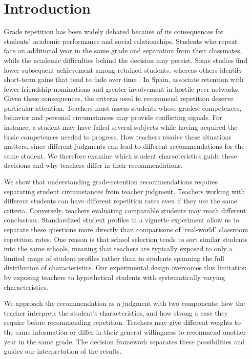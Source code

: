 \section{Introduction}
Grade repetition has been widely debated because of its consequences for students' academic performance and social relationships. Students who repeat face an additional year in the same grade and separation from their classmates, while the academic difficulties behind the decision may persist. Some studies find lower subsequent achievement among retained students, whereas others identify short-term gains that tend to fade over time \citep{allen,goos}. In Spain, \citet{branasjorrat} associate retention with fewer friendship nominations and greater involvement in hostile peer networks. Given these consequences, the criteria used to recommend repetition deserve particular attention. Teachers must assess students whose grades, competences, behavior and personal circumstances may provide conflicting signals. For instance, a student may have failed several subjects while having acquired the basic competences needed to progress. How teachers resolve these situations matters, since different judgments can lead to different recommendations for the same student. We therefore examine which student characteristics guide these decisions and why teachers differ in their recommendations.

We show that understanding grade-retention recommendations requires separating student circumstances from teacher judgment. Teachers working with different students can have different repetition rates even if they use the same criteria. Conversely, teachers evaluating comparable students may reach different conclusions. Standardized student profiles in a vignette experiment allow us to separate these questions more directly than comparisons of `real-world' classroom repetition rates. One reason is that school selection tends to sort similar students into the same schools, meaning that teachers are typically exposed to only a limited range of student profiles rather than to students spanning the full distribution of characteristics. Our experimental design overcomes this limitation by exposing teachers to hypothetical students with systematically varying characteristics.

We approach the recommendation as a judgment with two components: how the teacher interprets the student's characteristics, and how strong a case they require before recommending repetition. Teachers may give different weights to the same information or differ in their general willingness to recommend another year in the same grade. The decision framework separates these possibilities and guides our interpretation of the results.

